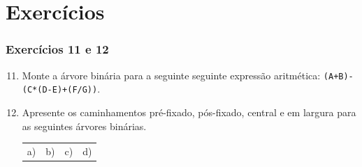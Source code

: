 \documentclass[aspectratio=169]{beamer}
\begin{document}
\section{Exercícios}

\begin{frame}[fragile]\frametitle{Exercícios 11 e 12}
\begin{enumerate}
	\setcounter{enumi}{10}
	\item Monte a árvore binária para a seguinte seguinte expressão aritmética:
\texttt{(A+B)-(C*(D-E)+(F/G))}.
	\item Apresente os caminhamentos pré-fixado, pós-fixado, central e em largura para as seguintes árvores binárias. \begin{tabular}{llll}%
a) & b) & c) & d)\\

\end{tabular}
\end{enumerate}
\end{frame}
\end{document}
